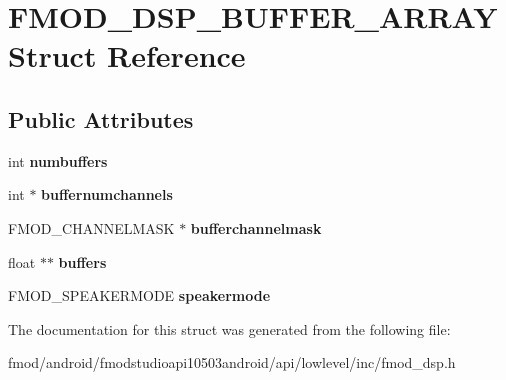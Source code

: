 \hypertarget{struct_f_m_o_d___d_s_p___b_u_f_f_e_r___a_r_r_a_y}{\section{F\+M\+O\+D\+\_\+\+D\+S\+P\+\_\+\+B\+U\+F\+F\+E\+R\+\_\+\+A\+R\+R\+A\+Y Struct Reference}
\label{struct_f_m_o_d___d_s_p___b_u_f_f_e_r___a_r_r_a_y}
}
\subsection*{Public Attributes}
\begin{DoxyCompactItemize}
\item 
\hypertarget{struct_f_m_o_d___d_s_p___b_u_f_f_e_r___a_r_r_a_y_a3b960754226681fb4b92b3b33eeec936}{int {\bfseries numbuffers}}\label{struct_f_m_o_d___d_s_p___b_u_f_f_e_r___a_r_r_a_y_a3b960754226681fb4b92b3b33eeec936}

\item 
\hypertarget{struct_f_m_o_d___d_s_p___b_u_f_f_e_r___a_r_r_a_y_aea46839a63dde0f8fa71c8a2f833dd89}{int $\ast$ {\bfseries buffernumchannels}}\label{struct_f_m_o_d___d_s_p___b_u_f_f_e_r___a_r_r_a_y_aea46839a63dde0f8fa71c8a2f833dd89}

\item 
\hypertarget{struct_f_m_o_d___d_s_p___b_u_f_f_e_r___a_r_r_a_y_a1e3d222e09390c7b6afffbde03b54a12}{F\+M\+O\+D\+\_\+\+C\+H\+A\+N\+N\+E\+L\+M\+A\+S\+K $\ast$ {\bfseries bufferchannelmask}}\label{struct_f_m_o_d___d_s_p___b_u_f_f_e_r___a_r_r_a_y_a1e3d222e09390c7b6afffbde03b54a12}

\item 
\hypertarget{struct_f_m_o_d___d_s_p___b_u_f_f_e_r___a_r_r_a_y_a74f2207aeb531627a61ddc3d7248e4b0}{float $\ast$$\ast$ {\bfseries buffers}}\label{struct_f_m_o_d___d_s_p___b_u_f_f_e_r___a_r_r_a_y_a74f2207aeb531627a61ddc3d7248e4b0}

\item 
\hypertarget{struct_f_m_o_d___d_s_p___b_u_f_f_e_r___a_r_r_a_y_a7d2f61def875095adaaa80125ced88e6}{F\+M\+O\+D\+\_\+\+S\+P\+E\+A\+K\+E\+R\+M\+O\+D\+E {\bfseries speakermode}}\label{struct_f_m_o_d___d_s_p___b_u_f_f_e_r___a_r_r_a_y_a7d2f61def875095adaaa80125ced88e6}

\end{DoxyCompactItemize}


The documentation for this struct was generated from the following file\+:\begin{DoxyCompactItemize}
\item 
fmod/android/fmodstudioapi10503android/api/lowlevel/inc/fmod\+\_\+dsp.\+h\end{DoxyCompactItemize}
